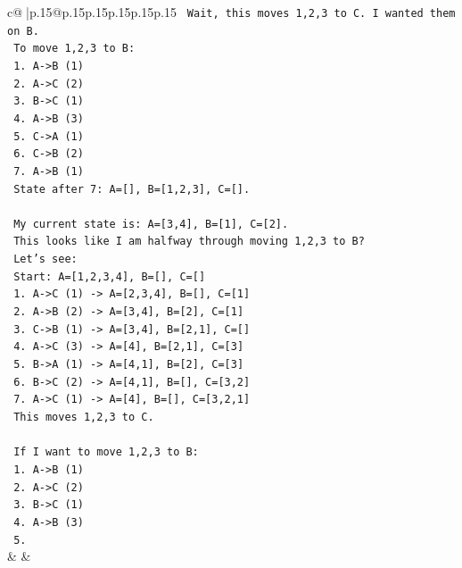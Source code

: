 \documentclass{article}
\begin{document}
{\begin{supertabular}{c@{$\;$}|p{.15\linewidth}@{}p{.15\linewidth}p{.15\linewidth}p{.15\linewidth}p{.15\linewidth}p{.15\linewidth}}
{{{\texttt{  Wait, this moves 1,2,3 to C. I wanted them on B.} \\
\texttt{  To move 1,2,3 to B:} \\
\texttt{  1. A{-}>B (1)} \\
\texttt{  2. A{-}>C (2)} \\
\texttt{  3. B{-}>C (1)} \\
\texttt{  4. A{-}>B (3)} \\
\texttt{  5. C{-}>A (1)} \\
\texttt{  6. C{-}>B (2)} \\
\texttt{  7. A{-}>B (1)} \\
\texttt{  State after 7: A={[}{]}, B={[}1,2,3{]}, C={[}{]}.} \\
\\ 
\texttt{  My current state is: A={[}3,4{]}, B={[}1{]}, C={[}2{]}.} \\
\texttt{  This looks like I am halfway through moving 1,2,3 to B?} \\
\texttt{  Let's see:} \\
\texttt{  Start: A={[}1,2,3,4{]}, B={[}{]}, C={[}{]}} \\
\texttt{  1. A{-}>C (1) {-}> A={[}2,3,4{]}, B={[}{]}, C={[}1{]}} \\
\texttt{  2. A{-}>B (2) {-}> A={[}3,4{]}, B={[}2{]}, C={[}1{]}} \\
\texttt{  3. C{-}>B (1) {-}> A={[}3,4{]}, B={[}2,1{]}, C={[}{]}} \\
\texttt{  4. A{-}>C (3) {-}> A={[}4{]}, B={[}2,1{]}, C={[}3{]}} \\
\texttt{  5. B{-}>A (1) {-}> A={[}4,1{]}, B={[}2{]}, C={[}3{]}} \\
\texttt{  6. B{-}>C (2) {-}> A={[}4,1{]}, B={[}{]}, C={[}3,2{]}} \\
\texttt{  7. A{-}>C (1) {-}> A={[}4{]}, B={[}{]}, C={[}3,2,1{]}} \\
\texttt{  This moves 1,2,3 to C.} \\
\\ 
\texttt{  If I want to move 1,2,3 to B:} \\
\texttt{  1. A{-}>B (1)} \\
\texttt{  2. A{-}>C (2)} \\
\texttt{  3. B{-}>C (1)} \\
\texttt{  4. A{-}>B (3)} \\
\texttt{  5.} \\
            }
        }
    }
    & & \\ \\


\end{supertabular}}
\end{document}
